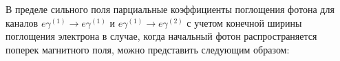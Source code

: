 \documentclass[cp1251%
               ]{jetp} %
\def\mprl{\mbox{\tiny $\|$}}
\begin{document}
В пределе сильного поля парциальные коэффициенты поглощения фотона для каналов $e \gamma^{(1)} \to 
 e\gamma^{(1)}$ и $e \gamma^{(1)} \to e\gamma^{(2)}$ с учетом конечной ширины 
 поглощения электрона в случае, когда начальный фотон 
 распространяется поперек магнитного поля, можно 
 представить следующим образом:

\begin{strip}

\end{strip}
\end{document}
